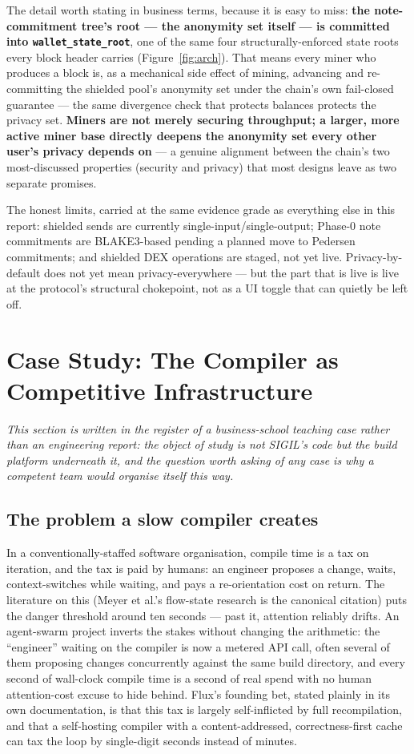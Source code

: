The detail worth stating in business terms, because it is easy to miss: \textbf{the note-commitment tree's root --- the anonymity set itself --- is committed into \texttt{wallet\_state\_root}}, one of the same four structurally-enforced state roots every block header carries (Figure~\ref{fig:arch}). That means every miner who produces a block is, as a mechanical side effect of mining, advancing and re-committing the shielded pool's anonymity set under the chain's own fail-closed guarantee --- the same divergence check that protects balances protects the privacy set. \textbf{Miners are not merely securing throughput; a larger, more active miner base directly deepens the anonymity set every other user's privacy depends on} --- a genuine alignment between the chain's two most-discussed properties (security and privacy) that most designs leave as two separate promises.

The honest limits, carried at the same evidence grade as everything else in this report: shielded sends are currently single-input/single-output; Phase-0 note commitments are BLAKE3-based pending a planned move to Pedersen commitments; and shielded DEX operations are staged, not yet live. Privacy-by-default does not yet mean privacy-everywhere --- but the part that is live is live at the protocol's structural chokepoint, not as a UI toggle that can quietly be left off.

\section{Case Study: The Compiler as Competitive Infrastructure}
\label{sec:casestudy}

\emph{This section is written in the register of a business-school teaching case rather than an engineering report: the object of study is not SIGIL's code but the build platform underneath it, and the question worth asking of any case is why a competent team would organise itself this way.}

\subsection{The problem a slow compiler creates}

In a conventionally-staffed software organisation, compile time is a tax on iteration, and the tax is paid by humans: an engineer proposes a change, waits, context-switches while waiting, and pays a re-orientation cost on return. The literature on this (Meyer et al.'s flow-state research is the canonical citation) puts the danger threshold around ten seconds --- past it, attention reliably drifts. An agent-swarm project inverts the stakes without changing the arithmetic: the ``engineer'' waiting on the compiler is now a metered API call, often several of them proposing changes concurrently against the same build directory, and every second of wall-clock compile time is a second of real spend with no human attention-cost excuse to hide behind. Flux's founding bet, stated plainly in its own documentation, is that this tax is largely self-inflicted by full recompilation, and that a self-hosting compiler with a content-addressed, correctness-first cache can tax the loop by single-digit seconds instead of minutes.

